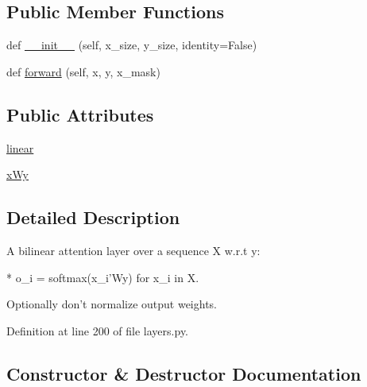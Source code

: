 \subsection*{Public Member Functions}
\begin{DoxyCompactItemize}
\item 
def \hyperlink{classparlai_1_1agents_1_1drqa_1_1layers_1_1BilinearSeqAttn_a78a4199a4dd90ac303f120cbe55af2a2}{\+\_\+\+\_\+init\+\_\+\+\_\+} (self, x\+\_\+size, y\+\_\+size, identity=False)
\item 
def \hyperlink{classparlai_1_1agents_1_1drqa_1_1layers_1_1BilinearSeqAttn_af6775803498ad914cd5e74cd228927e6}{forward} (self, x, y, x\+\_\+mask)
\end{DoxyCompactItemize}
\subsection*{Public Attributes}
\begin{DoxyCompactItemize}
\item 
\hyperlink{classparlai_1_1agents_1_1drqa_1_1layers_1_1BilinearSeqAttn_a9ec3eb5a5a3f38a5826b7dc02abbe925}{linear}
\item 
\hyperlink{classparlai_1_1agents_1_1drqa_1_1layers_1_1BilinearSeqAttn_a6a14946097618712765aba7243f0c075}{x\+Wy}
\end{DoxyCompactItemize}


\subsection{Detailed Description}
\begin{DoxyVerb}A bilinear attention layer over a sequence X w.r.t y:

* o_i = softmax(x_i'Wy) for x_i in X.

Optionally don't normalize output weights.
\end{DoxyVerb}
 

Definition at line 200 of file layers.\+py.



\subsection{Constructor \& Destructor Documentation}
\mbox{\label{classparlai_1_1agents_1_1drqa_1_1layers_1_1BilinearSeqAttn_a78a4199a4dd90ac303f120cbe55af2a2}} 

